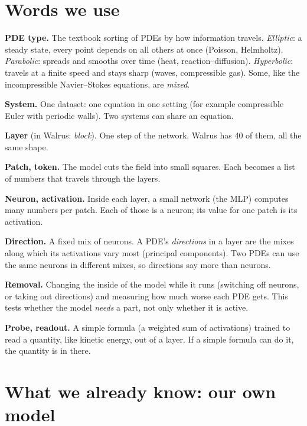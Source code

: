 \documentclass[11pt,a4paper]{article}
\begin{document}
\section{Words we use}

\begin{notebox}
\setlength{\parskip}{0.55em}
\textbf{PDE type.} The textbook sorting of PDEs by how information travels.
\emph{Elliptic}: a steady state, every point depends on all others at once (Poisson, Helmholtz).
\emph{Parabolic}: spreads and smooths over time (heat, reaction--diffusion).
\emph{Hyperbolic}: travels at a finite speed and stays sharp (waves, compressible gas).
Some, like the incompressible Navier--Stokes equations, are \emph{mixed}.

\textbf{System.} One dataset: one equation in one setting (for example compressible Euler with periodic walls).
Two systems can share an equation.

\textbf{Layer} (in Walrus: \emph{block}). One step of the network. Walrus has 40 of them, all the same shape.

\textbf{Patch, token.} The model cuts the field into small squares. Each becomes a list of numbers that travels through the layers.

\textbf{Neuron, activation.} Inside each layer, a small network (the MLP) computes many numbers per patch.
Each of those is a neuron; its value for one patch is its activation.

\textbf{Direction.} A fixed mix of neurons. A PDE's \emph{directions} in a layer are the mixes along which its activations vary most
(principal components). Two PDEs can use the same neurons in different mixes, so directions say more than neurons.

\textbf{Removal.} Changing the inside of the model while it runs (switching off neurons, or taking out directions)
and measuring how much worse each PDE gets. This tests whether the model \emph{needs} a part, not only whether it is active.

\textbf{Probe, readout.} A simple formula (a weighted sum of activations) trained to read a quantity, like kinetic energy,
out of a layer. If a simple formula can do it, the quantity is in there.
\end{notebox}

\section{What we already know: our own model}
\label{sec:known}
\end{document}
